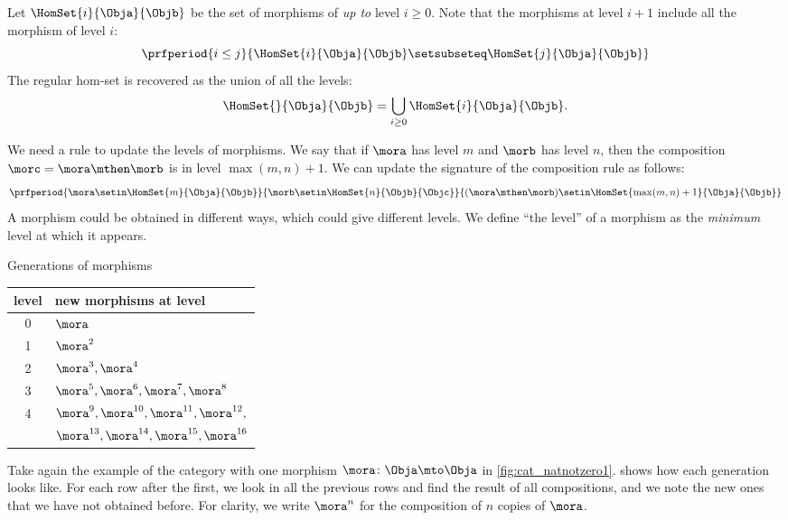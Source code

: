 Let $\HomSet{i}{\Obja}{\Objb}$ be the set of morphisms of \emph{up to} level $i\geq 0$.
Note that the morphisms at level $i+1$ include all the morphism of level $i$:
\begin{equation}
    \prfperiod{
        i \leq j
    }{
        \HomSet{i}{\Obja}{\Objb} \setsubseteq \HomSet{j}{\Obja}{\Objb}
    }
\end{equation}
The regular hom-set is recovered as the union of all the levels:
\begin{equation}
    \HomSet{}{\Obja}{\Objb} = \bigcup_{i\geq0} \HomSet{i}{\Obja}{\Objb}.
\end{equation}

We need a rule to update the levels of morphisms.
We say that if $\mora$ has level $m$ and $\morb$ has level $n$, then the composition $\morc = \mora\mthen\morb$ is in level $\max(m,n) + 1$.
We can update the signature of the composition rule as follows:
\begin{equation}
    \prfperiod{
        \mora \setin \HomSet{m}{\Obja}{\Objb}
    }{
        \morb \setin \HomSet{n}{\Objb}{\Objc}
    }{
        (\mora\mthen\morb) \setin \HomSet{\max(m,n)+1}{\Obja}{\Objb}
    }
\end{equation}
A morphism could be obtained in different ways, which could give different levels.
We define ``the level'' of a morphism as the \emph{minimum} level at which it appears.

\begin{margintable}
    \caption{Generations of morphisms }
    \begin{tabular}{cl}
        level & new morphisms at level \\
        \hline
        0     & $\mora$ \\
        1     & $\mora^2$ \\
        2     & $\mora^3, \mora^4$ \\
        3     & $\mora^5, \mora^6, \mora^7, \mora^8$ \\
        4     & $\mora^9, \mora^{10}, \mora^{11}, \mora^{12}, $ \\
              & $\mora^{13}, \mora^{14}, \mora^{15}, \mora^{16}$
    \end{tabular}
    \label{tab:generations}

\end{margintable}

Take again the example of the category with one morphism $\mora\colon\Obja \mto \Obja$ in \cref{fig:cat_natnotzero1}.
 shows how each generation looks like.
For each row after the first,
we look in all the previous rows and find the result of all compositions, and we note the new ones that we have not obtained before.
For clarity, we write $\mora^n$ for the composition of $n$ copies of $\mora$.

